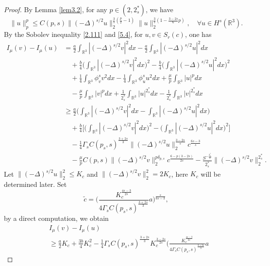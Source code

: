 \documentclass[reqno]{amsart}
\begin{document}
\begin{proof}
By Lemma {\ref{lem3.2}}, for any $p\in(2, 2^*_s)$, we have
 \begin{equation}\label{5.4}
\|u\|^p_p\leq C{(p,s)}\|(-\Delta)^{s/2}u\|^{\frac{3}{s}(\frac{p}{2}-1)}_2
\|u\|^{\frac{3}{s}(1-\frac{3-2s}{6}p)}_2, \quad \forall u\in H^s(\mathbb{R}^3).
\end{equation}
By the Sobolev inequality \eqref{2.111} and \eqref{5.4}, for $u, v\in  S_{r}(c)$, 
one has
\begin{align*} %
I_\mu(v)-I_\mu(u)
&= \frac{a}{2}\int_{\mathbb{R}^3}|(-\Delta)^{s/2}v|^2dx
 -\frac{a}{2}\int_{\mathbb{R}^3}|(-\Delta)^{s/2}u|^2dx\\
&\quad +\frac{b}{4}\Big(\int_{\mathbb{R}^3}|(-\Delta)^{s/2}v|^2dx\Big)^2
 -\frac{b}{4}\Big(\int_{\mathbb{R}^3}|(-\Delta)^{s/2}u|^2dx\Big)^2\\
&\quad +\frac{1}{4}\int_{\mathbb{R}^3}\phi^s_v v^2dx-\frac{1}{4}
 \int_{\mathbb{R}^3}\phi^s_u u^2dx+\frac{\mu}{p}\int_{\mathbb{R}^3}|u|^pdx\\
&\quad -\frac{\mu}{p}\int_{\mathbb{R}^3}|v|^pdx+\frac{1}{2^*_s}\int_{\mathbb{R}^3}|u|^{2^*_s}dx-\frac{1}{2^*_s}\int_{\mathbb{R}^3}|v|^{2^*_s}dx\\
&\geq   \frac{a}{2}\Big(\int_{\mathbb{R}^3}|(-\Delta)^{s/2}v|^2dx
 -\int_{\mathbb{R}^3}|(-\Delta)^{s/2}u|^2dx\Big)\\
&\quad +\frac{b}{4}\Big[\Big(\int_{\mathbb{R}^3}|(-\Delta)^{s/2}v|^2dx\Big)^2
 -\Big(\int_{\mathbb{R}^3}|(-\Delta)^{s/2}u|^2dx\Big)^2\Big]\\
&\quad -\frac{1}{4}\Gamma_sC(p_s, s)^{\frac{3+2s}{3}}\|(-\Delta)^{s/2}u\|^{\frac{3-2s}
{s}}_2c^{\frac{6s-3}{s}}\\
&\quad -\frac{\mu}{p}C(p,s)\|(-\Delta)^{s/2}v\|^{p {\delta_{p,s}}}_2 
 c^{\frac{6-p(3-2s)}{2s}}
 -\frac{S^{-\frac{2^*_s}{2}}}{2^*_s}\|(-\Delta)^{s/2}v\|^{2^*_s}_2.
\end{align*}
Let $\|(-\Delta)^{s/2}u\|^2_2\leq K_c$ and $\|(-\Delta)^{s/2}v\|^2_2=2K_c$, 
here $K_c$ will be determined later. Set
$$
\tilde{c}=\Big(\frac{K_c^{\frac{4s-3}{2s}}}{4\Gamma_s C(p_s, s)^{\frac{3+2s}{3}}}a
 \Big)^{\frac{s}{6s-3}},
$$
by a direct computation, we obtain
\begin{equation}\label{5.6}
\begin{split}
&I_\mu(v)-I_\mu(u) \\
&\geq \frac{a}{2}K_c+\frac{3b}{4}K^2_c-\frac{1}{4}\Gamma_s
  C(p_s, s)^{\frac{3+2s}{3}} K^{\frac{3-2s}{2s}}_c 
  \Big(\frac{K_c^{\frac{4s-3}{2s}}}{4\Gamma_s C(p_s, s)^{\frac{3+2s}{3}}}a

\end{split}
\end{equation}
\end{proof}
\end{document}
